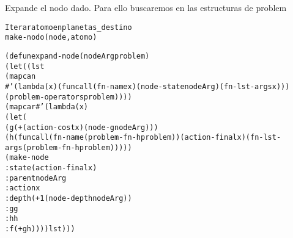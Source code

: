 \begin{aibox}{\comments}
Expande el nodo dado. Para ello buscaremos en las estructuras de problem 

\end{aibox}

\begin{aibox}{\pseudocode}
\begin{alltt}
Iterar atomo en planetas\_destino
	make-nodo (node,atomo)

\end{alltt}
\end{aibox}

\begin{aibox}{\code}
\begin{alltt}
(defun expand-node (nodeArg problem)
	(let ((lst
        	(mapcan
            	\#'(lambda(x)  (funcall (fn-name x) (node-state nodeArg) (fn-lst-args x))) (problem-operators problem))))
			(mapcar \#'(lambda(x) 
				(let (
					(g (+ (action-cost x) (node-g nodeArg)))
					(h (funcall (fn-name (problem-fn-h problem)) (action-final x) ( fn-lst-args (problem-fn-h problem)))))
						(make-node
							:state (action-final x)
							:parent nodeArg
							:action x
							:depth (+ 1 (node-depth nodeArg))
							:g g
							:h h
							:f (+ g h)))) lst)))





\end{alltt}
\end{aibox}
